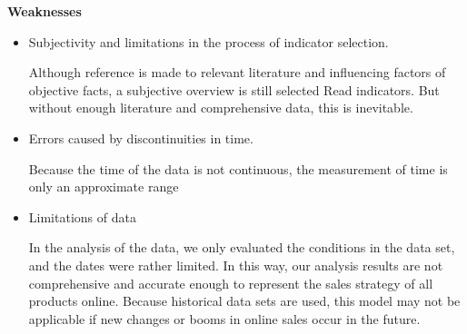 \documentclass{mcmthesis}
\begin{document}
	
\textbf{Weaknesses}
	\begin{itemize}
	
	\item Subjectivity and limitations in the process of indicator selection.
	
	Although reference is made to relevant literature and influencing factors of objective facts, a subjective overview is still selected
	Read indicators. But without enough literature and comprehensive data, this is inevitable.
	
	\item Errors caused by discontinuities in time.
	
	Because the time of the data is not continuous, the measurement of time is only an approximate range
	
	\item Limitations of data
	
	In the analysis of the data, we only evaluated the conditions in the data set, and the dates were rather limited. In this way, our analysis results are not comprehensive and accurate enough to represent the sales strategy of all products online. Because historical data sets are used, this model may not be applicable if new changes or booms in online sales occur in the future.
	
	\end{itemize}
\newpage


\end{document}
